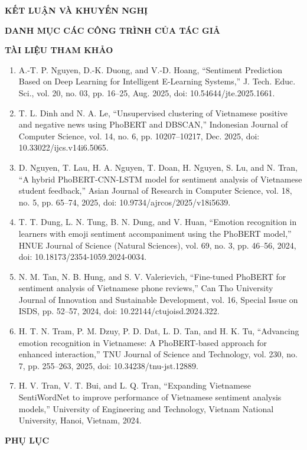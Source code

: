 \noindent\textbf{\Large KẾT LUẬN VÀ KHUYẾN NGHỊ}

\medskip\noindent\textbf{\Large DANH MỤC CÁC CÔNG TRÌNH CỦA TÁC GIẢ}

\medskip\noindent\textbf{\Large TÀI LIỆU THAM KHẢO}

\begin{enumerate}
    \item A.-T. P. Nguyen, D.-K. Duong, and V.-D. Hoang, ``Sentiment Prediction Based on Deep Learning for Intelligent E-Learning Systems,'' J. Tech. Educ. Sci., vol. 20, no. 03, pp. 16--25, Aug. 2025, doi: 10.54644/jte.2025.1661.

    \item T. L. Dinh and N. A. Le, ``Unsupervised clustering of Vietnamese positive and negative news using PhoBERT and DBSCAN,'' Indonesian Journal of Computer Science, vol. 14, no. 6, pp. 10207--10217, Dec. 2025, doi: 10.33022/ijcs.v14i6.5065.

    \item D. Nguyen, T. Lau, H. A. Nguyen, T. Doan, H. Nguyen, S. Lu, and N. Tran, ``A hybrid PhoBERT-CNN-LSTM model for sentiment analysis of Vietnamese student feedback,'' Asian Journal of Research in Computer Science, vol. 18, no. 5, pp. 65--74, 2025, doi: 10.9734/ajrcos/2025/v18i5639.

    \item T. T. Dung, L. N. Tung, B. N. Dung, and V. Huan, ``Emotion recognition in learners with emoji sentiment accompaniment using the PhoBERT model,'' HNUE Journal of Science (Natural Sciences), vol. 69, no. 3, pp. 46--56, 2024, doi: 10.18173/2354-1059.2024-0034.

    \item N. M. Tan, N. B. Hung, and S. V. Valerievich, ``Fine-tuned PhoBERT for sentiment analysis of Vietnamese phone reviews,'' Can Tho University Journal of Innovation and Sustainable Development, vol. 16, Special Issue on ISDS, pp. 52--57, 2024, doi: 10.22144/ctujoisd.2024.322.

    \item H. T. N. Tram, P. M. Dzuy, P. D. Dat, L. D. Tan, and H. K. Tu, ``Advancing emotion recognition in Vietnamese: A PhoBERT-based approach for enhanced interaction,'' TNU Journal of Science and Technology, vol. 230, no. 7, pp. 255--263, 2025, doi: 10.34238/tnu-jst.12889.

    \item H. V. Tran, V. T. Bui, and L. Q. Tran, ``Expanding Vietnamese SentiWordNet to improve performance of Vietnamese sentiment analysis models,'' University of Engineering and Technology, Vietnam National University, Hanoi, Vietnam, 2024.
\end{enumerate}

\medskip\noindent\textbf{\Large PHỤ LỤC}


